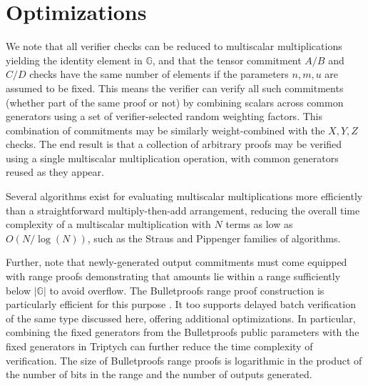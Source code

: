 \documentclass[draft]{article}
\newcommand{\G}{\mathbb{G}}
\begin{document}
\section{Optimizations}
We note that all verifier checks can be reduced to multiscalar multiplications yielding the identity element in $\G$, and that the tensor commitment $A/B$ and $C/D$ checks have the same number of elements if the parameters $n,m,u$ are assumed to be fixed.
This means the verifier can verify all such commitments (whether part of the same proof or not) by combining scalars across common generators using a set of verifier-selected random weighting factors.
This combination of commitments may be similarly weight-combined with the $X,Y,Z$ checks.
The end result is that a collection of arbitrary proofs may be verified using a single multiscalar multiplication operation, with common generators reused as they appear.

Several algorithms exist for evaluating multiscalar multiplications more efficiently than a straightforward multiply-then-add arrangement, reducing the overall time complexity of a multiscalar multiplication with $N$ terms as low as $O(N/\log(N))$, such as the Straus \cite{straus} and Pippenger \cite{pippenger} families of algorithms.

Further, note that newly-generated output commitments must come equipped with range proofs demonstrating that amounts lie within a range sufficiently below $|\G|$ to avoid overflow.
The Bulletproofs range proof construction is particularly efficient for this purpose \cite{bulletproofs}.
It too supports delayed batch verification of the same type discussed here, offering additional optimizations.
In particular, combining the fixed generators from the Bulletproofs public parameters with the fixed generators in Triptych can further reduce the time complexity of verification.
The size of Bulletproofs range proofs is logarithmic in the product of the number of bits in the range and the number of outputs generated.




\end{document}
